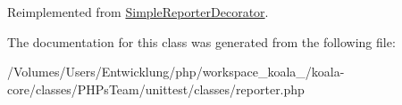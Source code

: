 Reimplemented from \hyperlink{class_simple_reporter_decorator_a571852c647ef03d0486353aed21d79f9}{SimpleReporterDecorator}.



The documentation for this class was generated from the following file:\begin{DoxyCompactItemize}
\item 
/Volumes/Users/Entwicklung/php/workspace\_\-koala\_/koala-\/core/classes/PHPsTeam/unittest/classes/reporter.php\end{DoxyCompactItemize}
